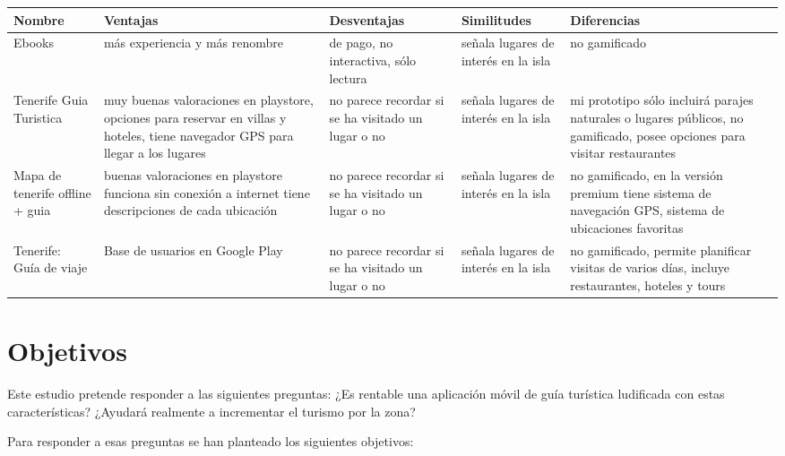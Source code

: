 \documentclass{report}
\begin{document}
\begin{tabularx}{0.9\textwidth} { 
  | >{\centering\arraybackslash}X 
  | >{\centering\arraybackslash}X
  | >{\centering\arraybackslash}X
  | >{\centering\arraybackslash}X
  | >{\centering\arraybackslash}X | }
 \hline
 Nombre & Ventajas & Desventajas & Similitudes & Diferencias\\
 \hline\hline
 Ebooks & más experiencia y más renombre & de pago, no interactiva, sólo lectura & señala lugares de interés en la isla & no gamificado  \\
\hline
Tenerife Guia Turistica & muy buenas valoraciones en playstore, opciones para reservar en villas y hoteles, tiene navegador GPS para llegar a los lugares & no parece recordar si se ha visitado un lugar o no & señala lugares de interés en la isla & mi prototipo sólo incluirá parajes naturales o lugares públicos, no gamificado, posee opciones para visitar restaurantes \\
\hline
Mapa de tenerife offline + guia & buenas valoraciones en playstore funciona sin conexión a internet tiene descripciones de cada ubicación & no parece recordar si se ha visitado un lugar o no & señala lugares de interés en la isla & no gamificado, en la versión premium tiene sistema de navegación GPS, sistema de ubicaciones favoritas \\
\hline
Tenerife: Guía de viaje & Base de usuarios en Google Play & no parece recordar si se ha visitado un lugar o no& señala lugares de interés en la isla & no gamificado, permite planificar visitas de varios días, incluye restaurantes, hoteles y tours \\
\hline
\end{tabularx}

\section{Objetivos}
Este estudio pretende responder a las siguientes preguntas: ¿Es rentable una aplicación móvil de guía turística ludificada con estas características? ¿Ayudará realmente a incrementar el turismo por la zona?

Para responder a esas preguntas se han planteado los siguientes objetivos:
\end{document}
